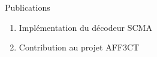 \documentclass[t,compress,mathserif,12pt,xcolor=dvipsnames]{beamer}
\begin{document}
\begin{frame}[c]{Publications}

  \begin{enumerate}
\renewcommand{\section}[2]{} %

    \renewcommand*{\bibfont}{\scriptsize}
    \nocite{leonardon_fast_2017,leonardon_custom_2018,ghaffari_improving_2017,leonardon_tta_2018,Ghaffari2018,cassagne_fast_2017,cassagne_gdr_2017}
    \vfill
    \item<+-> Implémentation du décodeur SCMA
    \printbibliography[keyword={ghaffari}]
    \vfill
    \item<+-> Contribution au projet AFF3CT
    \printbibliography[keyword={aff3ct}]
    \vfill
  \end{enumerate}

\end{frame}
\end{document}
